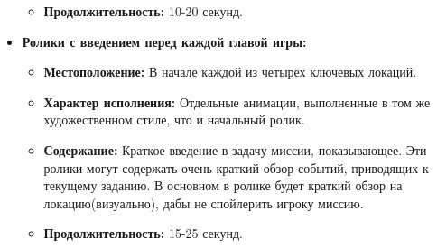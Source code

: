 \documentclass{article}
\begin{document}
\begin{itemize}
\begin{itemize}
        \item \textbf{Продолжительность:}  10-20 секунд.\par
  \end{itemize}
\item \textbf{Ролики с введением перед каждой главой игры:} 
    \begin{itemize}
        \item \textbf{Местоположение:} В начале каждой из четырех ключевых локаций.\par
        \item \textbf{Характер исполнения:} Отдельные анимации, выполненные в том же художественном стиле, что и начальный ролик.\par
        \item \textbf{Содержание:} Краткое введение в задачу миссии, показывающее. Эти ролики могут содержать очень краткий обзор событий, приводящих к текущему заданию. В основном в ролике будет краткий обзор на локацию(визуально), дабы не спойлерить игроку миссию. \par
        \item \textbf{Продолжительность:} 15-25 секунд.\par
  \end{itemize}


\end{itemize}
\end{document}
